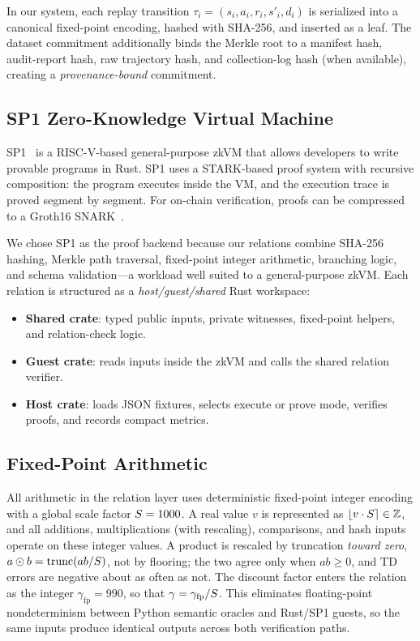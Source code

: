 In our system, each replay transition $\tau_i = (s_i, a_i, r_i, s'_i, d_i)$
is serialized into a canonical fixed-point encoding, hashed with SHA-256, and
inserted as a leaf. The dataset commitment additionally binds the Merkle root
to a manifest hash, audit-report hash, raw trajectory hash, and collection-log
hash (when available), creating a \emph{provenance-bound} commitment.

\subsection{SP1 Zero-Knowledge Virtual Machine}\label{subsec:sp1}

SP1~\cite{succinct2024sp1} is a RISC-V-based general-purpose zkVM that allows
developers to write provable programs in Rust. SP1 uses a STARK-based proof
system with recursive composition: the program executes inside the VM, and the
execution trace is proved segment by segment. For on-chain verification, proofs
can be compressed to a Groth16 SNARK~\cite{groth2016zksnark}.

We chose SP1 as the proof backend because our relations combine SHA-256
hashing, Merkle path traversal, fixed-point integer arithmetic, branching
logic, and schema validation---a workload well suited to a general-purpose
zkVM. Each relation is structured as a \emph{host/guest/shared} Rust workspace:
\begin{itemize}[leftmargin=1.5em]
  \item \textbf{Shared crate}: typed public inputs, private witnesses,
  fixed-point helpers, and relation-check logic.
  \item \textbf{Guest crate}: reads inputs inside the zkVM and calls the
  shared relation verifier.
  \item \textbf{Host crate}: loads JSON fixtures, selects execute or prove
  mode, verifies proofs, and records compact metrics.
\end{itemize}

\subsection{Fixed-Point Arithmetic}\label{subsec:fixedpoint}

All arithmetic in the relation layer uses deterministic fixed-point integer
encoding with a global scale factor $S = 1000$. A real value $v$ is
represented as $\lfloor v \cdot S \rceil \in \mathbb{Z}$, and all
additions, multiplications (with rescaling), comparisons, and hash inputs
operate on these integer values. A product is rescaled by truncation
\emph{toward zero}, $a \odot b = \operatorname{trunc}(ab / S)$, not by
flooring; the two agree only when $ab \ge 0$, and TD errors are negative
about as often as not. The discount factor enters the relation as the
integer $\gamma_{\mathrm{fp}} = 990$, so that $\gamma = \gamma_{\mathrm{fp}} / S$.
This eliminates floating-point
nondeterminism between Python semantic oracles and Rust/SP1 guests, so the same
inputs produce identical outputs across both verification paths.

